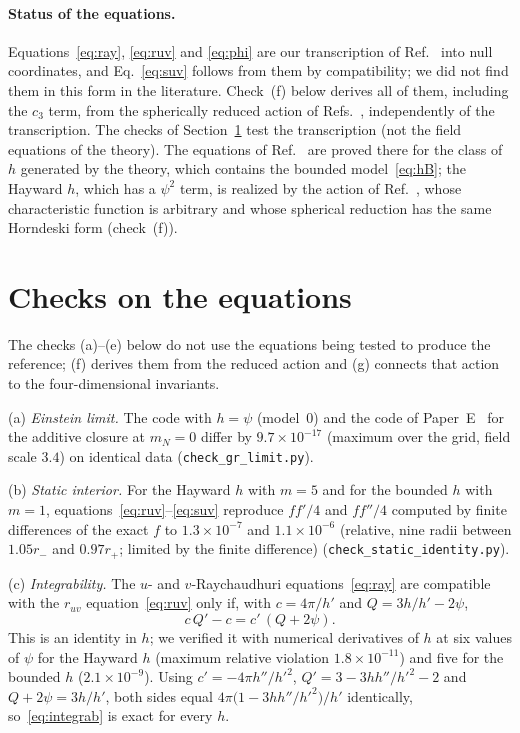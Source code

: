 \documentclass[11pt]{article}
\begin{document}
\paragraph{Status of the equations.} Equations~\eqref{eq:ray}, \eqref{eq:ruv} and \eqref{eq:phi} are our transcription of Ref.~\cite{BuenoCanoHennigarMurcia2025} into null coordinates, and Eq.~\eqref{eq:suv} follows from them by compatibility; we did not find them in this form in the literature. Check~(f) below derives all of them, including the $c_3$ term, from the spherically reduced action of Refs.~\cite{BuenoCanoHennigarMurcia2025,BorissovaCarballoRubio2026}, independently of the transcription. The checks of Section~\ref{sec:checks} test the transcription (not the field equations of the theory). The equations of Ref.~\cite{BuenoCanoHennigarMurcia2025} are proved there for the class of $h$ generated by the theory, which contains the bounded model~\eqref{eq:hB}; the Hayward $h$, which has a $\psi^{2}$ term, is realized by the action of Ref.~\cite{BorissovaCarballoRubio2026}, whose characteristic function is arbitrary and whose spherical reduction has the same Horndeski form (check~(f)).

\section{Checks on the equations}
\label{sec:checks}

The checks (a)--(e) below do not use the equations being tested to produce the reference; (f) derives them from the reduced action and (g) connects that action to the four-dimensional invariants.

(a) \emph{Einstein limit.} The code with $h=\psi$ (model~0) and the code of Paper~E~\citep{PaperE} for the additive closure at $m_N=0$ differ by $9.7\times10^{-17}$ (maximum over the grid, field scale $3.4$) on identical data (\texttt{check\_gr\_limit.py}).

(b) \emph{Static interior.} For the Hayward $h$ with $m=5$ and for the bounded $h$ with $m=1$, equations~\eqref{eq:ruv}--\eqref{eq:suv} reproduce $ff'/4$ and $ff''/4$ computed by finite differences of the exact $f$ to $1.3\times10^{-7}$ and $1.1\times10^{-6}$ (relative, nine radii between $1.05r_-$ and $0.97r_+$; limited by the finite difference) (\texttt{check\_static\_identity.py}).

(c) \emph{Integrability.} The $u$- and $v$-Raychaudhuri equations~\eqref{eq:ray} are compatible with the $r_{uv}$ equation~\eqref{eq:ruv} only if, with $c=4\pi/h'$ and $Q=3h/h'-2\psi$,
\begin{equation}
c\,Q'-c=c'\,(Q+2\psi) .
\label{eq:integrab}
\end{equation}
This is an identity in $h$; we verified it with numerical derivatives of $h$ at six values of $\psi$ for the Hayward $h$ (maximum relative violation $1.8\times10^{-11}$) and five for the bounded $h$ ($2.1\times10^{-9}$). Using $c'=-4\pi h''/h'^{2}$, $Q'=3-3hh''/h'^{2}-2$ and $Q+2\psi=3h/h'$, both sides equal $4\pi\bigl(1-3hh''/h'^{2}\bigr)/h'$ identically, so~\eqref{eq:integrab} is exact for every $h$.
\end{document}
